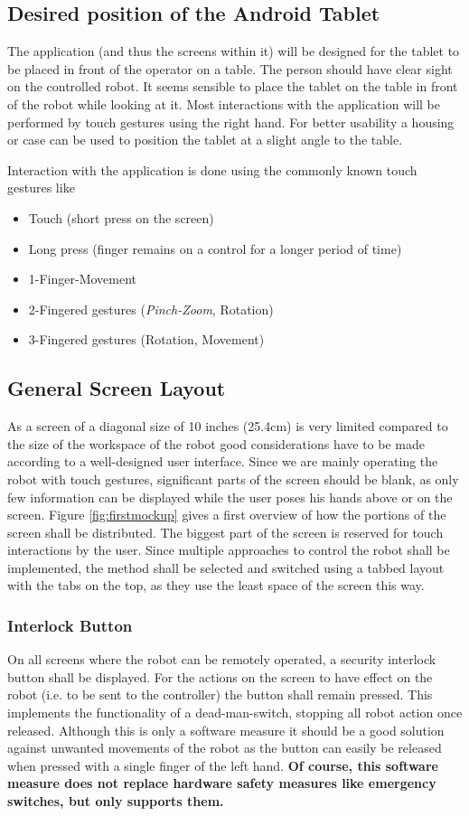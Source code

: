 \subsection{Desired position of the Android Tablet}
The application (and thus the screens within it) will be designed for the tablet to be placed in front of the operator on a table. The person should have clear sight on the controlled robot. It seems sensible to place the tablet on the table in front of the robot while looking at it. Most interactions with the application will be performed by touch gestures using the right hand. For better usability a housing or case can be used to position the tablet at a slight angle to the table. 


Interaction with the application is done using the commonly known touch gestures like
\begin{itemize}
	\item Touch (short press on the screen)
	\item Long press (finger remains on a control for a longer period of time)
	\item 1-Finger-Movement
	\item 2-Fingered gestures (\textit{Pinch-Zoom}, Rotation)
	\item 3-Fingered gestures (Rotation, Movement)
\end{itemize}

\subsection{General Screen Layout}
\label{sec:ui:layout}
As a screen of a diagonal size of 10 inches (25.4cm) is very limited compared to the size of the workspace of the robot good considerations have to be made according to a well-designed user interface. Since we are mainly operating the robot with touch gestures, significant parts of the screen should be blank, as only few information can be displayed while the user poses his hands above or on the screen. Figure \ref{fig:firstmockup} gives a first overview of how the portions of the screen shall be distributed. The biggest part of the screen is reserved for touch interactions by the user. Since multiple approaches to control the robot shall be implemented, the method shall be selected and switched using a tabbed layout with the tabs on the top, as they use the least space of the screen this way.

\subsubsection{Interlock Button}
On all screens where the robot can be remotely operated, a security interlock button shall be displayed. For the actions on the screen to have effect on the robot (i.e. to be sent to the controller) the button shall remain pressed. This implements the functionality of a dead-man-switch, stopping all robot action once released. Although this is only a software measure it should be a good solution against unwanted movements of the robot as the button can easily be released when pressed with a single finger of the left hand. \textbf{Of course, this software measure does not replace hardware safety measures like emergency switches, but only supports them.}

